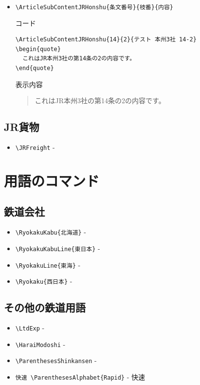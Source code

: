 \documentclass[oneside,10pt,a4paper]{jsarticle}
\begin{document}
\begin{itemize}
\begin{itembox}[l]{表示内容}
\begin{quote}
          これはJR本州3社の第14条の内容です。
        \end{quote}
      \end{itembox}
    \item \verb|\ArticleSubContentJRHonshu{条文番号}{枝番}{内容}|
      \begin{itembox}[l]{コード}
        \begin{verbatim}
\ArticleSubContentJRHonshu{14}{2}{テスト 本州3社 14-2}
\begin{quote}
  これはJR本州3社の第14条の2の内容です。
\end{quote}\end{verbatim}
      \end{itembox}
      \begin{itembox}[l]{表示内容}
        \begin{quote}
          これはJR本州3社の第14条の2の内容です。
        \end{quote}
      \end{itembox}
  \end{itemize}

  \subsection{JR貨物}

  \begin{itemize}
    \item \verb|\JRFreight| - \JRFreight
  \end{itemize}

  \newpage

  \section{用語のコマンド}

  \subsection{鉄道会社}

  \begin{itemize}
    \item \verb|\RyokakuKabu{北海道}| - 
    \item \verb|\RyokakuKabuLine{東日本}| - 
    \item \verb|\RyokakuLine{東海}| - 
    \item \verb|\Ryokaku{西日本}| - 
  \end{itemize}

  \subsection{その他の鉄道用語}

  \begin{itemize}
    \item \verb|\LtdExp| - \LtdExp
    \item \verb|\HaraiModoshi| - \HaraiModoshi
    \item \verb|\ParenthesesShinkansen| - \ParenthesesShinkansen
    \item \verb|快速 \ParenthesesAlphabet{Rapid}| - 快速 
  \end{itemize}
\end{document}

